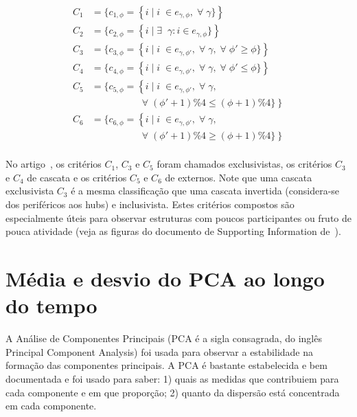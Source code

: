 \documentclass[a4paper,openright,12pt]{report} %
\begin{document}
\begin{equation}
	\begin{split}
		C_1&=\{c_{1,\phi}=\left\{i\mid i\;\in e_{\gamma,\phi}, \;\forall\; \gamma\}\right\} \\
		C_2&=\{c_{2,\phi}=\left\{i\mid \exists \;\;\gamma: i \in e_{\gamma,\phi}\}\right\} \\
		C_3&=\{c_{3,\phi}=\left\{i\mid i\;\in e_{\gamma,\phi'}, \;\forall\; \gamma,\;\forall\;\phi'\geq \phi\}\right\} \\
		C_4&=\{c_{4,\phi}=\left\{i\mid i\;\in e_{\gamma,\phi'}, \;\forall\; \gamma,\;\forall\;\phi'\leq \phi\}\right\} \\
		C_5&=\{c_{5,\phi}=\left\{i\mid i\;\in e_{\gamma,\phi'}, \;\forall\; \gamma,\right.\\
																																	&\;\;\;\;\;\;\;\;\;\;\;\;\;\;\;\;\;\; \left.\;\forall\;(\phi'+1)\%4\leq (\phi+1)\%4\}\right\} \\
		C_6&=\{c_{6,\phi}=\left\{i\mid i\;\in e_{\gamma,\phi'}, \;\forall\; \gamma,\right.\\
																																	&\;\;\;\;\;\;\;\;\;\;\;\;\;\;\;\;\;\; \left.\;\forall\;(\phi'+1)\%4\geq (\phi+1)\%4\}\right\} \\
	\end{split}
\end{equation}


No artigo~\cite{timeS}, os critérios $C_1$, $C_3$ e $C_5$ foram chamados exclusivistas, os critérios $C_3$ e $C_4$ de cascata e os critérios $C_5$ e $C_6$ de externos. Note que uma cascata exclusivista $C_3$ é a mesma classificação que uma cascata invertida (considera-se dos periféricos aos hubs) e inclusivista. Estes critérios compostos são especialmente úteis para observar estruturas com poucos participantes ou fruto de pouca atividade (veja as figuras do documento de Supporting Information de~\cite{timeS}).

\section{Média e desvio do PCA ao longo do tempo}
A Análise de Componentes Principais (PCA é a sigla consagrada, do inglês Principal Component Analysis) foi usada para observar a estabilidade
na formação das componentes principais.
A PCA é bastante estabelecida e bem documentada
e foi usado para saber: 
1) quais as medidas que contribuiem para cada componente e em que proporção;
2) quanto da dispersão está concentrada em cada componente.
\end{document}
